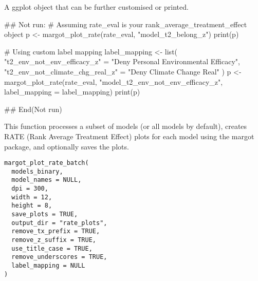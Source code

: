 \documentclass[a4paper]{book}
\begin{document}
%
\begin{Value}
A ggplot object that can be further customised or printed.
\end{Value}
%
\begin{Examples}
\begin{ExampleCode}
## Not run: 
# Assuming rate_eval is your rank_average_treatment_effect object
p <- margot_plot_rate(rate_eval, "model_t2_belong_z")
print(p)

# Using custom label mapping
label_mapping <- list(
  "t2_env_not_env_efficacy_z" = "Deny Personal Environmental Efficacy",
  "t2_env_not_climate_chg_real_z" = "Deny Climate Change Real"
)
p <- margot_plot_rate(rate_eval, "model_t2_env_not_env_efficacy_z",
                      label_mapping = label_mapping)
print(p)

## End(Not run)

\end{ExampleCode}
\end{Examples}
%
\begin{Description}
This function processes a subset of models (or all models by default), creates RATE (Rank Average Treatment Effect)
plots for each model using the margot package, and optionally saves the plots.
\end{Description}
%
\begin{Usage}
\begin{verbatim}
margot_plot_rate_batch(
  models_binary,
  model_names = NULL,
  dpi = 300,
  width = 12,
  height = 8,
  save_plots = TRUE,
  output_dir = "rate_plots",
  remove_tx_prefix = TRUE,
  remove_z_suffix = TRUE,
  use_title_case = TRUE,
  remove_underscores = TRUE,
  label_mapping = NULL
)
\end{verbatim}
\end{Usage}
%
\end{document}
